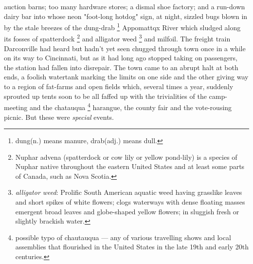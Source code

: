 auction barns; too many hardware stores; a dismal shoe factory; and a run-down 
dairy bar into whose neon "foot-long hotdog" sign, at night, sizzled 
bugs blown in by the stale 
breezes of the dung-drab 
\footnote{dung(n.) means manure, drab(adj.) means dull. }
Appomattqx River which sludged 
along its fosses 
of spatterdock 
\footnote{ Nuphar advena (spatterdock or cow lily or yellow pond-lily) is a
species of Nuphar native throughout the eastern United States and at least some
parts of Canada, such as Nova Scotia.}
and alligator weed 
\footnote{\textit{alligator weed}: Prolific South American aquatic weed having grasslike
leaves and short spikes of white flowers; clogs waterways with dense floating
masses emergent broad leaves and globe-shaped yellow flowers; in sluggish fresh
or slightly brackish water.}
and milfoil. 
The freight train Darconville had heard but hadn't yet seen chugged
through town once in a while on its way to Cincinnati, but as it had long ago
stopped taking on passengers, the station had fallen into disrepair. The town
came to an abrupt halt at both ends, a foolish watertank marking the limits on
one side and the other giving way to a region of fat-farms and open fields
which, several times a year, suddenly sprouted 
up tents soon to be all faffed 
up with the trivialities of the camp-meeting and the chatauqua 
\footnote{\textdbend possible typo of chautauqua --- any of various 
travelling shows and local assemblies that flourished in the United 
States in the late 19th and early 20th centuries. }
harangue, 
the county fair and the vote-rousing picnic. But these were \textit{special}
events.

